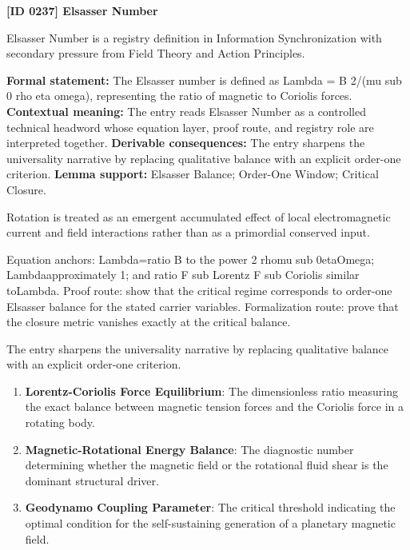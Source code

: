\clearpage
\noindent\textbf{[ID 0237] Elsasser Number}\par
\vspace{0.35em}
\begingroup\small
{}
Elsasser Number is a registry definition in Information Synchronization with secondary pressure from Field Theory and Action Principles.

\begingroup\footnotesize\setlength{\emergencystretch}{3em}\sloppy
\textbf{Formal statement:} The Elsasser number is defined as Lambda = B 2/(mu sub 0 rho eta omega), representing the ratio of magnetic to Coriolis forces. \textbf{Contextual meaning:} The entry reads Elsasser Number as a controlled technical headword whose equation layer, proof route, and registry role are interpreted together. \textbf{Derivable consequences:} The entry sharpens the universality narrative by replacing qualitative balance with an explicit order-one criterion. \textbf{Lemma support:} Elsasser Balance; Order-One Window; Critical Closure.\par
\endgroup

Rotation is treated as an emergent accumulated effect of local electromagnetic current and field interactions rather than as a primordial conserved input.

Equation anchors: Lambda=ratio B to the power 2 rhomu sub 0etaOmega; Lambdaapproximately 1; and ratio F sub Lorentz F sub Coriolis similar toLambda. Proof route: show that the critical regime corresponds to order-one Elsasser balance for the stated carrier variables. Formalization route: prove that the closure metric vanishes exactly at the critical balance.

The entry sharpens the universality narrative by replacing qualitative balance with an explicit order-one criterion.
\endgroup

\begin{enumerate}[leftmargin=1.6em,itemsep=6pt,topsep=4pt]
\item \textbf{Lorentz-Coriolis Force Equilibrium}: The dimensionless ratio measuring the exact balance between magnetic tension forces and the Coriolis force in a rotating body.
\item \textbf{Magnetic-Rotational Energy Balance}: The diagnostic number determining whether the magnetic field or the rotational fluid shear is the dominant structural driver.
\item \textbf{Geodynamo Coupling Parameter}: The critical threshold indicating the optimal condition for the self-sustaining generation of a planetary magnetic field.
\end{enumerate}

